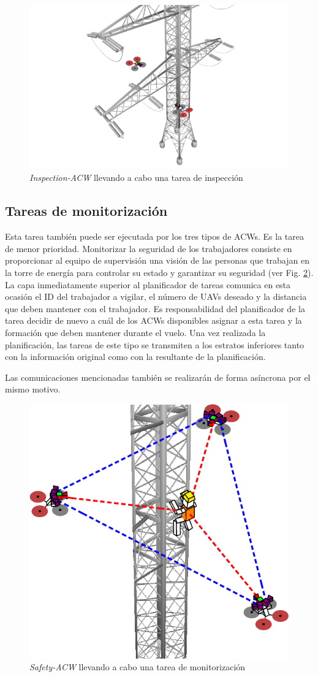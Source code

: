 \documentclass[fontsize=11pt, English=false, Español=true, Myfinal=true, twoside, numbers=noenddot]{scrbook}
\begin{document}
\begin{figure}[htbp]
    \centering
    \includegraphics[width=.75\linewidth]
    {ProblemFormulation/figures/inspection_task.pdf}
    \caption{\textit{Inspection-ACW} llevando a cabo una tarea de inspección}
    \label{fig:inspection_task}
\end{figure}

\subsection{Tareas de monitorización}
\label{subsec:MonitoringTasks}
Esta tarea también puede ser ejecutada por los tres tipos de \glspl{ACW}. Es la tarea de menor prioridad. Monitorizar la seguridad de los trabajadores consiste en proporcionar al equipo de supervisión una visión de las personas que trabajan en la torre de energía para controlar su estado y garantizar su seguridad (ver Fig. \ref{fig:monitor_task}). La capa inmediatamente superior al planificador de tareas comunica en esta ocasión el \gls{ID} del trabajador a vigilar, el número de \glspl{UAV} deseado y la distancia que deben mantener con el trabajador. Es responsabilidad del planificador de la tarea decidir de nuevo a cuál de los \glspl{ACW} disponibles asignar a esta tarea y la formación que deben mantener durante el vuelo. Una vez realizada la planificación, las tareas de este tipo se transmiten a los estratos inferiores tanto con la información original como con la resultante de la planificación.

Las comunicaciones mencionadas también se realizarán de forma asíncrona por el mismo motivo. 

\begin{figure}[htbp]
    \centering
    \includegraphics[width=0.5\linewidth]
    {ProblemFormulation/figures/monitor_task.pdf}
    \caption{\textit{Safety-ACW} llevando a cabo una tarea de monitorización}
    \label{fig:monitor_task}
\end{figure}
\end{document}
